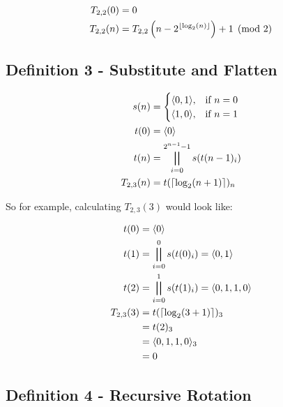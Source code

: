 \documentclass[conference]{IEEEtran}
\begin{document}

\begin{equation}
    \label{eq:p2d02}
    \begin{aligned}
T_{2,2}(0) &= 0 \\
T_{2,2}(n) &= T_{2,2}\left(n - 2^{\floor{\log_2(n)}}\right) + 1 \pmod{2}
    \end{aligned}
\end{equation}

\subsection{Definition 3 - Substitute and Flatten}


\begin{equation}
    \label{eq:p2d03}
    \begin{aligned}
      s(n) &= \begin{cases}
          \tuple{0, 1}, & \text{if } n = 0 \\
          \tuple{1, 0}, & \text{if } n = 1
      \end{cases} \\
      t(0) &= \tuple{0} \\
      t(n) &= \bigparallel_{i=0}^{2^{n-1}-1} s(t(n-1)_i)  \\
T_{2,3}(n) &= t(\ceil{\log_2(n + 1)})_n
    \end{aligned}
\end{equation}

So for example, calculating $T_{2,3}(3)$ would look like:

\begin{equation}
    \begin{aligned}
      t(0) &= \langle 0 \rangle \\
      t(1) &= \bigparallel_{i=0}^{0} s(t(0)_i) = \langle 0, 1 \rangle \\
      t(2) &= \bigparallel_{i=0}^{1} s(t(1)_i) = \langle 0, 1, 1, 0 \rangle \\
T_{2,3}(3) &= t(\left\lceil \log_2(3 + 1) \right\rceil)_3 \\
           &= t(2)_3 \\
           &= \langle 0, 1, 1, 0 \rangle_3 \\
           &= 0
    \end{aligned}
\end{equation}

\subsection{Definition 4 - Recursive Rotation}
\end{document}
